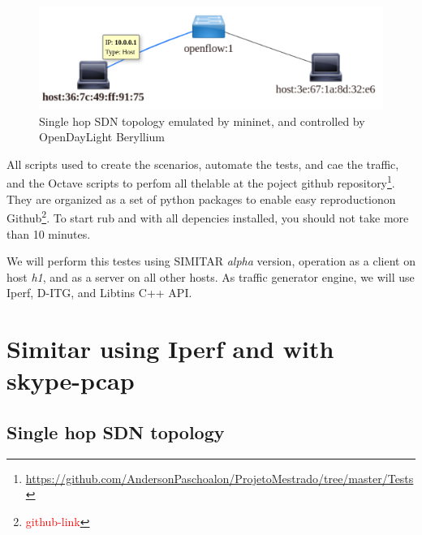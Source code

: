 \begin{figure}[!ht]
	\centering
	\includegraphics[scale=0.4]{figures/ch5/topo-simple}
	\caption{Single hop SDN topology emulated by mininet, and controlled by OpenDayLight Beryllium}
	\label{fig:topo-simple}
\end{figure}

All scripts used to create the scenarios, automate the tests, and cae the traffic, and the Octave scripts to perfom all thelable at the poject github repository\footnote{\href{https://github.com/AndersonPaschoalon/ProjetoMestrado/tree/master/Tests}{https://github.com/AndersonPaschoalon/ProjetoMestrado/tree/master/Tests}}. They are organized as a set of python packages to enable easy reproductionon Github\footnote{\textcolor{red}{github-link}}. To start rub and with all depencies installed, you should not take more than 10 minutes.

We will perform this testes using SIMITAR \textit{alpha} version, operation as a client on host \textit{h1}, and as a server on all other hosts. As traffic generator engine, we will use Iperf, D-ITG, and Libtins C++ API. 

\section{Simitar using Iperf and with skype-pcap}

\subsection{Single hop SDN topology}



